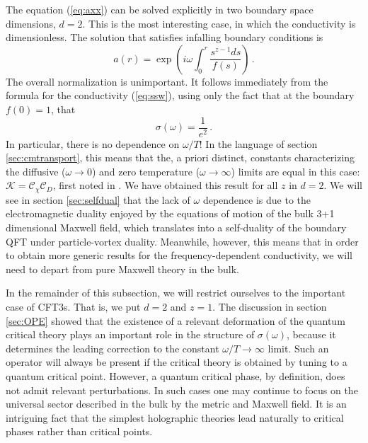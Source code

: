 \documentclass[10pt, oneside]{book}
\def\be{\begin{equation}}
\def\ee{\end{equation}}
\begin{document}
\begin{doublespace}
The equation (\ref{eq:axx}) can be solved explicitly in two boundary space dimensions, $d=2$. This is the most interesting case, in which the conductivity is dimensionless. The solution that satisfies infalling boundary conditions is
\be
a(r) = \exp\left( i \omega \int_0^{r} \frac{s^{z-1} ds}{f(s)} \right)\,.
\ee
The overall normalization is unimportant. It follows immediately from the formula for the conductivity (\ref{eq:ssw}), using only the fact that at the boundary $f(0) = 1$, that
\be\label{eq:Le}
\sigma(\omega) = \frac{1}{e^2} \,.
\ee
In particular, there is no dependence on $\omega/T$! In the language of section \ref{sec:cmtransport}, this means that the, a priori distinct, constants characterizing the diffusive ($\omega \to 0$) and zero temperature ($\omega \to \infty$) limits are equal in this case: ${\mathcal K} = {\mathcal C}_\chi {\mathcal C}_D$, first noted in \cite{Herzog:2007ij}. We have obtained this result for all $z$ in $d=2$. We will see in section \ref{sec:selfdual} that the lack of $\omega$ dependence is due to the electromagnetic duality enjoyed by the equations of motion of the bulk 3+1 dimensional Maxwell field, which translates into a self-duality of the boundary QFT under particle-vortex duality. Meanwhile, however, this means that in order to obtain more generic results for the frequency-dependent conductivity, we will need to depart from pure Maxwell theory in the bulk.

In the remainder of this subsection, we will restrict ourselves to the important case of CFT3s. That is, we put $d=2$ and $z=1$. The discussion in section \ref{sec:OPE} showed that the existence of a relevant deformation of the quantum critical theory plays an important role in the structure of $\sigma(\omega)$, because it determines the leading correction to the constant $\omega/T \to \infty$ limit. Such an operator will always be present if the critical theory is obtained by tuning to a quantum critical point. However, a quantum critical phase, by definition, does not admit relevant perturbations. In such cases one may continue to focus on the universal sector described in the bulk by the metric and Maxwell field. It is an intriguing fact that the simplest holographic theories lead naturally to critical phases rather than critical points.


\end{doublespace}
\end{document}
